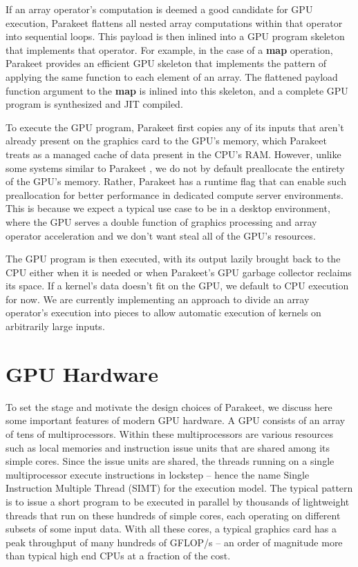 \documentclass[preprint]{sigplanconf}
\begin{document}
If an array operator's computation is deemed a good candidate for GPU execution, Parakeet flattens all nested array computations within that operator into sequential loops.  This payload is then inlined into a GPU program skeleton that implements that operator.  For example, in the case of a \textbf{map} operation, Parakeet provides an efficient GPU skeleton that implements the pattern of applying the same function to each element of an array.  The flattened payload function argument to the \textbf{map} is inlined into this skeleton, and a complete GPU program is synthesized and JIT compiled.

To execute the GPU program, Parakeet first copies any of its inputs that aren't already present on the graphics card to the GPU's memory, which Parakeet treats as a managed cache of data present in the CPU's RAM.  However, unlike some systems similar to Parakeet \cite{Chaf11}, we do not by default preallocate the entirety of the GPU's memory.  Rather, Parakeet has a runtime flag that can enable such preallocation for better performance in dedicated compute server environments.  This is because we expect a typical use case to be in a desktop environment, where the GPU serves a double function of graphics processing and array operator acceleration and we don't want steal all of the GPU's resources.

The GPU program is then executed, with its output lazily brought back to the CPU either when it is needed or when Parakeet's GPU garbage collector reclaims its space. If a kernel's data doesn't fit on the GPU, we default to CPU execution for now.  We are currently implementing an approach to divide an array operator's execution into pieces to allow automatic execution of kernels on arbitrarily large inputs.

\section{GPU Hardware}
To set the stage and motivate the design choices of Parakeet, we discuss here some important features of modern GPU hardware.  A GPU consists of an array of tens of multiprocessors.  Within these multiprocessors are various resources such as local memories and instruction issue units that are shared among its simple cores. Since the issue units are shared, the threads running on a single multiprocessor execute instructions in lockstep -- hence the name Single Instruction Multiple Thread (SIMT) for the execution model.  The typical pattern is to issue a short program to be executed in parallel by thousands of lightweight threads that run on these hundreds of simple cores, each operating on different subsets of some input data.  With all these cores, a typical graphics card has a peak throughput of many hundreds of GFLOP/s -- an order of magnitude more than typical high end CPUs at a fraction of the cost.
\end{document}
